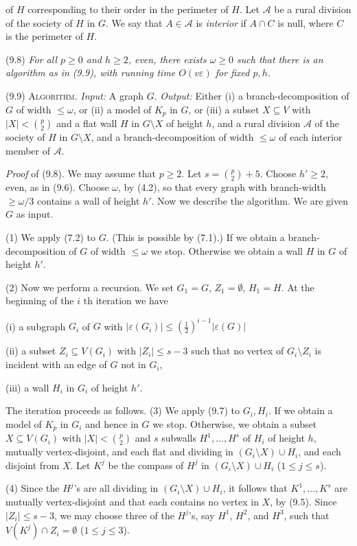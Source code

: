 \noindent of $H$ corresponding to their order in the perimeter of $H$. Let $\mathcal{A}$ be a rural division of the society of $H$ in $G$. We say that $A \in \mathcal{A}$ is \textit{interior} if $A \cap C$ is null, where $C$ is the perimeter of $H$.

\stmt
(9.8) \textit{For all $p \ge 0$ and $h \ge 2$, even, there exists $\omega \ge 0$ such that there is an algorithm as in (9.9), with running time $O(v\varepsilon)$ for fixed $p, h$.}

\stmt
(9.9) \textsc{Algorithm}. \textit{Input:} A graph $G$. \textit{Output:} Either (i) a branch-decomposition of $G$ of width $\le \omega$, or (ii) a model of $K_p$ in $G$, or (iii) a subset $X \subseteq V$ with $|X| < \binom{p}{2}$ and a flat wall $H$ in $G \setminus X$ of height $h$, and a rural division $\mathcal{A}$ of the society of $H$ in $G \setminus X$, and a branch-decomposition of width $\le \omega$ of each interior member of $\mathcal{A}$.

\textit{Proof} of (9.8). We may assume that $p \ge 2$. Let $s = \binom{p}{2} + 5$. Choose $h' \ge 2$, even, as in (9.6). Choose $\omega$, by (4.2), so that every graph with branch-width $\ge \omega/3$ contains a wall of height $h'$. Now we describe the algorithm. We are given $G$ as input.

\hspace*{12pt}(1) We apply (7.2) to $G$. (This is possible by (7.1).) If we obtain a branch-decomposition of $G$ of width $\le \omega$ we stop. Otherwise we obtain a wall $H$ in $G$ of height $h'$.

\hspace*{12pt}(2) Now we perform a recursion. We set $G_1 = G$, $Z_1 = \emptyset$, $H_1 = H$. At the beginning of the $i$ th iteration we have

\hspace*{12pt}(i) a subgraph $G_i$ of $G$ with $|\varepsilon(G_i)| \le (\frac{1}{2})^{i-1} |\varepsilon(G)|$

\hspace*{12pt}(ii) a subset $Z_i \subseteq V(G_i)$ with $|Z_i| \le s - 3$ such that no vertex of $G_i \setminus Z_i$ is incident with an edge of $G$ not in $G_i$,

\hspace*{12pt}(iii) a wall $H_i$ in $G_i$ of height $h'$.

The iteration proceeds as follows. (3) We apply (9.7) to $G_i, H_i$. If we obtain a model of $K_p$ in $G_i$ and hence in $G$ we stop. Otherwise, we obtain a subset $X \subseteq V(G_i)$ with $|X| < \binom{p}{2}$ and $s$ subwalls $H^1, \dots, H^s$ of $H_i$ of height $h$, mutually vertex-disjoint, and each flat and dividing in $(G_i \setminus X) \cup H_i$, and each disjoint from $X$. Let $K^j$ be the compass of $H^j$ in $(G_i \setminus X) \cup H_i$ ($1 \le j \le s$).

\hspace*{12pt}(4) Since the $H^j$'s are all dividing in $(G_i \setminus X) \cup H_i$, it follows that $K^1, \dots, K^s$ are mutually vertex-disjoint and that each contains no vertex in $X$, by (9.5). Since $|Z_i| \le s - 3$, we may choose three of the $H^j$'s, say $H^1$, $H^2$, and $H^3$, such that $V(K^j) \cap Z_i = \emptyset$ ($1 \le j \le 3$).
